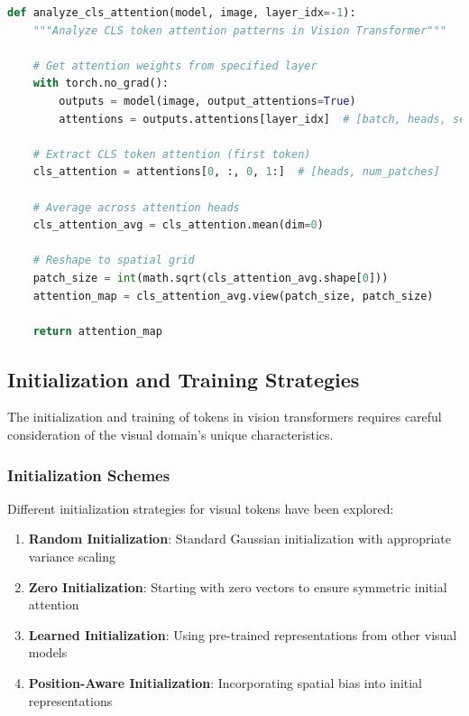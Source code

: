 \begin{lstlisting}[language=Python, caption=Analyzing CLS attention patterns in ViT]
def analyze_cls_attention(model, image, layer_idx=-1):
    """Analyze CLS token attention patterns in Vision Transformer"""
    
    # Get attention weights from specified layer
    with torch.no_grad():
        outputs = model(image, output_attentions=True)
        attentions = outputs.attentions[layer_idx]  # [batch, heads, seq_len, seq_len]
    
    # Extract CLS token attention (first token)
    cls_attention = attentions[0, :, 0, 1:]  # [heads, num_patches]
    
    # Average across attention heads
    cls_attention_avg = cls_attention.mean(dim=0)
    
    # Reshape to spatial grid
    patch_size = int(math.sqrt(cls_attention_avg.shape[0]))
    attention_map = cls_attention_avg.view(patch_size, patch_size)
    
    return attention_map
\end{lstlisting}

\subsection{Initialization and Training Strategies}

The initialization and training of \cls{} tokens in vision transformers requires careful consideration of the visual domain's unique characteristics.

\subsubsection{Initialization Schemes}

Different initialization strategies for visual \cls{} tokens have been explored:

\begin{enumerate}
\item \textbf{Random Initialization}: Standard Gaussian initialization with appropriate variance scaling
\item \textbf{Zero Initialization}: Starting with zero vectors to ensure symmetric initial attention
\item \textbf{Learned Initialization}: Using pre-trained representations from other visual models
\item \textbf{Position-Aware Initialization}: Incorporating spatial bias into initial representations
\end{enumerate}

